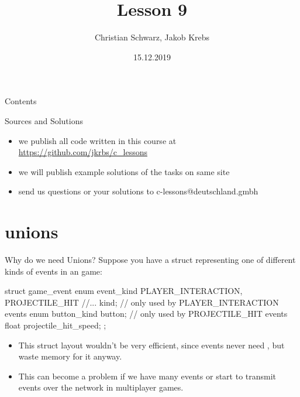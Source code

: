 \documentclass[10pt,graphics,aspectratio=169,table]{beamer}
\title{Lesson 9}
\author{Christian Schwarz, Jakob Krebs}
\date{15.12.2019}
\begin{document}
\maketitle

\begin{frame}{Contents}
    \tableofcontents
\end{frame}

\begin{frame}{Sources and Solutions}
    \begin{itemize}
        \item we publish all code written in this course at \url{https://github.com/jkrbs/c_lessons}
        \item we will publish example solutions of the tasks on same site
        \item send us questions or your solutions to c-lessons@deutschland.gmbh
    \end{itemize}
\end{frame}

\section{unions}
\begin{frame}[fragile]{Why do we need Unions?}
    Suppose you have a struct representing one of different kinds of 
    events in an game:
    \begin{codeblock}
struct game_event{
    enum event_kind {
        PLAYER_INTERACTION, PROJECTILE_HIT //...
    } kind;
    // only used by PLAYER_INTERACTION events   
    enum button_kind button; 
    // only used by PROJECTILE_HIT events
    float projectile_hit_speed; 
};
    \end{codeblock}

    \begin{itemize}
        \item This struct layout wouldn't be very efficient, since
         events never need ,
        but waste memory for it anyway.
        \item This can become a problem if we have many events or start
        to transmit events over the network in multiplayer games.
    \end{itemize} 
 
\end{frame}
\end{document}
